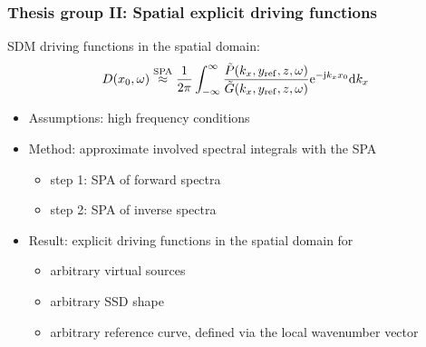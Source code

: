 \documentclass{beamer}
\begin{document}
\begin{frame}
\frametitle{Thesis group II: Spatial explicit driving functions}
%
SDM driving functions in the spatial domain:
\begin{equation*}
D(x_0,\omega) \stackrel{\text{SPA}}{\approx}  \frac{1}{2\pi} \int_{-\infty}^{\infty} \frac{\tilde{P}(k_x,y_{\mathrm{ref}},z, \omega) }{\tilde{G}(k_x,y_{\mathrm{ref}},z, \omega)} \mathrm{e}^{-\mathrm{j} k_x x_0} \mathrm{d} k_x
\end{equation*}
\begin{itemize}
\item Assumptions: high frequency conditions
\item Method: approximate involved spectral integrals with the SPA
	\begin{itemize}
	\item step 1: SPA of forward spectra
	\item step 2: SPA of inverse spectra
	\end{itemize}
\end{itemize}
\vspace{5mm}
\begin{tcolorbox}
\begin{itemize}
\item Result: explicit driving functions in the spatial domain for
	\begin{itemize}
	\item arbitrary virtual sources
	\item arbitrary SSD shape
	\item arbitrary reference curve, defined via the local wavenumber vector
	\end{itemize}
\end{itemize}
\end{tcolorbox}
\end{frame} 
\end{document}

